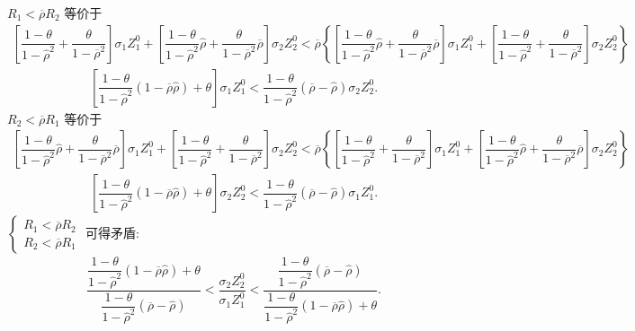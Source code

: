 \documentclass[10.0pt]{article}
\begin{document}
$ R_1 < \overline{\rho} R_2 $ 等价于 
{\footnotesize \begin{eqnarray*}
\left[ \dfrac{1 - \theta}{1 - {\hat \rho}^2} + \dfrac{\theta}{1 - \overline{\rho}^2} \right] \sigma_1 Z_1^0 + \left[ \dfrac{1 - \theta}{1 - {\hat \rho}^2} {\hat \rho} + \dfrac{\theta}{1 - \overline{\rho}^2} \overline{\rho} \right] \sigma_2 Z_2^0 < \overline{\rho} \left\{ \left[ \dfrac{1 - \theta}{1 - {\hat \rho}^2} {\hat \rho} + \dfrac{\theta}{1 - \overline{\rho}^2} \overline{\rho} \right] \sigma_1 Z_1^0 + \left[ \dfrac{1 - \theta}{1 - {\hat \rho}^2} + \dfrac{\theta}{1 - \overline{\rho}^2} \right] \sigma_2 Z_2^0 \right\}
\end{eqnarray*}}
\begin{eqnarray*}
\left[ \dfrac{1 - \theta}{1 - {\hat \rho}^2} (1 - \overline{\rho} {\hat \rho}) + \theta \right] \sigma_1 Z_1^0 < \dfrac{1 - \theta}{1 - {\hat \rho}^2} (\overline{\rho} - {\hat \rho}) \sigma_2 Z_2^0.
\end{eqnarray*}
$ R_2 < \overline{\rho} R_1 $ 等价于 
{\footnotesize \begin{eqnarray*}
\left[ \dfrac{1 - \theta}{1 - {\hat \rho}^2} {\hat \rho} + \dfrac{\theta}{1 - \overline{\rho}^2} \overline{\rho} \right] \sigma_1 Z_1^0 + \left[ \dfrac{1 - \theta}{1 - {\hat \rho}^2} + \dfrac{\theta}{1 - \overline{\rho}^2} \right] \sigma_2 Z_2^0 < \overline{\rho} \left\{ \left[ \dfrac{1 - \theta}{1 - {\hat \rho}^2} + \dfrac{\theta}{1 - \overline{\rho}^2} \right] \sigma_1 Z_1^0 + \left[ \dfrac{1 - \theta}{1 - {\hat \rho}^2} {\hat \rho} + \dfrac{\theta}{1 - \overline{\rho}^2} \overline{\rho} \right] \sigma_2 Z_2^0 \right\}
\end{eqnarray*}}
\begin{eqnarray*}
\left[ \dfrac{1 - \theta}{1 - {\hat \rho}^2} (1 - \overline{\rho} {\hat \rho}) + \theta \right] \sigma_2 Z_2^0 < \dfrac{1 - \theta}{1 - {\hat \rho}^2} (\overline{\rho} - {\hat \rho}) \sigma_1 Z_1^0.
\end{eqnarray*}
$ \left\{ \begin{matrix} R_1 < \overline{\rho} R_2 \\ R_2 < \overline{\rho} R_1 \end{matrix} \right. $ 可得矛盾:
\begin{eqnarray*}
\dfrac{\dfrac{1 - \theta}{1 - {\hat \rho}^2} (1 - \overline{\rho} {\hat \rho}) + \theta}{\dfrac{1 - \theta}{1 - {\hat \rho}^2} (\overline{\rho} - {\hat \rho})} < \dfrac{\sigma_2 Z_2^0}{\sigma_1 Z_1^0} < \dfrac{\dfrac{1 - \theta}{1 - {\hat \rho}^2} (\overline{\rho} - {\hat \rho})}{\dfrac{1 - \theta}{1 - {\hat \rho}^2} (1 - \overline{\rho} {\hat \rho}) + \theta}.
\end{eqnarray*}
\end{document}
